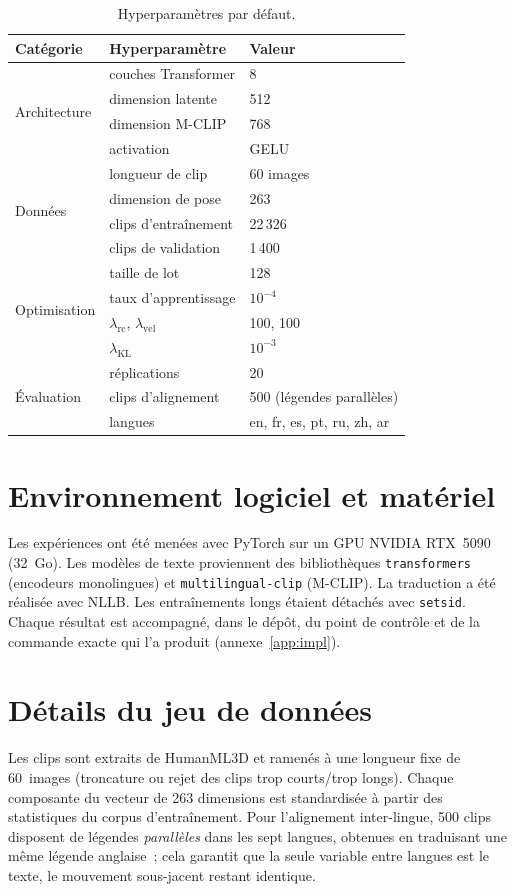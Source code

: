 \documentclass[12pt,a4paper,oneside]{report}
\theoremstyle{definition}
\theoremstyle{plain}
\newcommand{\lkl}{\ensuremath{\lambda_{\mathrm{KL}}}}
\newcommand{\lrc}{\ensuremath{\lambda_{\mathrm{rc}}}}
\newcommand{\lvel}{\ensuremath{\lambda_{\mathrm{vel}}}}
\begin{document}
\begin{table}[ht]
\centering
\caption{Hyperparamètres par défaut.}
\label{tab:hyper}
\small
\begin{tabular}{@{}lll@{}}
\toprule
Catégorie & Hyperparamètre & Valeur \\
\midrule
\multirow{4}{*}{Architecture}
 & couches Transformer & 8 \\
 & dimension latente & 512 \\
 & dimension M-CLIP & 768 \\
 & activation & GELU \\
\midrule
\multirow{4}{*}{Données}
 & longueur de clip & 60 images \\
 & dimension de pose & 263 \\
 & clips d'entraînement & 22\,326 \\
 & clips de validation & 1\,400 \\
\midrule
\multirow{4}{*}{Optimisation}
 & taille de lot & 128 \\
 & taux d'apprentissage & $10^{-4}$ \\
 & $\lrc$, $\lvel$ & 100, 100 \\
 & $\lkl$ & $10^{-3}$ \\
\midrule
\multirow{3}{*}{Évaluation}
 & réplications & 20 \\
 & clips d'alignement & 500 (légendes parallèles) \\
 & langues & en, fr, es, pt, ru, zh, ar \\
\bottomrule
\end{tabular}
\end{table}

\section{Environnement logiciel et matériel}
Les expériences ont été menées avec PyTorch sur un GPU NVIDIA RTX~5090 (32~Go). Les
modèles de texte proviennent des bibliothèques \texttt{transformers} (encodeurs
monolingues) et \texttt{multilingual-clip} (M-CLIP). La traduction a été réalisée
avec NLLB. Les entraînements longs étaient détachés avec \texttt{setsid}. Chaque
résultat est accompagné, dans le dépôt, du point de contrôle et de la commande
exacte qui l'a produit (annexe~\ref{app:impl}).

\section{Détails du jeu de données}
Les clips sont extraits de HumanML3D et ramenés à une longueur fixe de 60~images
(troncature ou rejet des clips trop courts/trop longs). Chaque composante du
vecteur de 263 dimensions est standardisée à partir des statistiques du corpus
d'entraînement. Pour l'alignement inter-lingue, 500 clips disposent de légendes
\emph{parallèles} dans les sept langues, obtenues en traduisant une même légende
anglaise~; cela garantit que la seule variable entre langues est le texte, le
mouvement sous-jacent restant identique.
\end{document}

